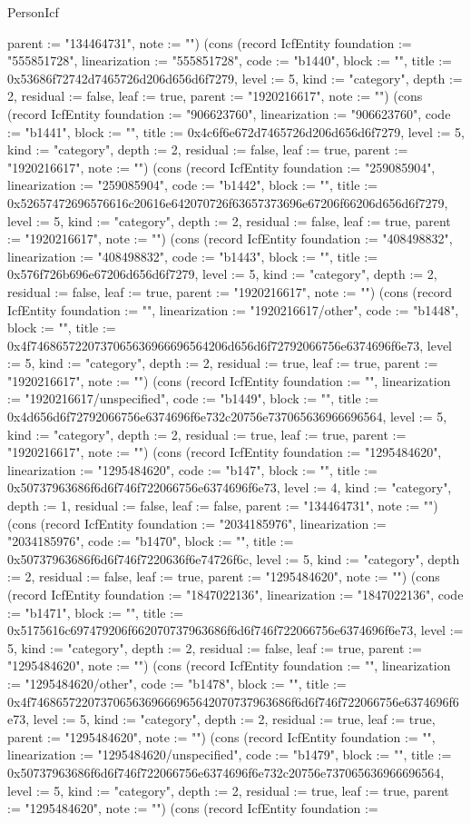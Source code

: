 \begin{lexlean}{PersonIcf}
\begin{semanticmodule}
{parent := "134464731", note := ""}) (cons (record IcfEntity {foundation := "555851728", linearization := "555851728", code := "b1440", block := "", title := 0x53686f72742d7465726d206d656d6f7279, level := 5, kind := "category", depth := 2, residual := false, leaf := true, parent := "1920216617", note := ""}) (cons (record IcfEntity {foundation := "906623760", linearization := "906623760", code := "b1441", block := "", title := 0x4c6f6e672d7465726d206d656d6f7279, level := 5, kind := "category", depth := 2, residual := false, leaf := true, parent := "1920216617", note := ""}) (cons (record IcfEntity {foundation := "259085904", linearization := "259085904", code := "b1442", block := "", title := 0x52657472696576616c20616e642070726f63657373696e67206f66206d656d6f7279, level := 5, kind := "category", depth := 2, residual := false, leaf := true, parent := "1920216617", note := ""}) (cons (record IcfEntity {foundation := "408498832", linearization := "408498832", code := "b1443", block := "", title := 0x576f726b696e67206d656d6f7279, level := 5, kind := "category", depth := 2, residual := false, leaf := true, parent := "1920216617", note := ""}) (cons (record IcfEntity {foundation := "", linearization := "1920216617/other", code := "b1448", block := "", title := 0x4f7468657220737065636966696564206d656d6f72792066756e6374696f6e73, level := 5, kind := "category", depth := 2, residual := true, leaf := true, parent := "1920216617", note := ""}) (cons (record IcfEntity {foundation := "", linearization := "1920216617/unspecified", code := "b1449", block := "", title := 0x4d656d6f72792066756e6374696f6e732c20756e737065636966696564, level := 5, kind := "category", depth := 2, residual := true, leaf := true, parent := "1920216617", note := ""}) (cons (record IcfEntity {foundation := "1295484620", linearization := "1295484620", code := "b147", block := "", title := 0x50737963686f6d6f746f722066756e6374696f6e73, level := 4, kind := "category", depth := 1, residual := false, leaf := false, parent := "134464731", note := ""}) (cons (record IcfEntity {foundation := "2034185976", linearization := "2034185976", code := "b1470", block := "", title := 0x50737963686f6d6f746f7220636f6e74726f6c, level := 5, kind := "category", depth := 2, residual := false, leaf := true, parent := "1295484620", note := ""}) (cons (record IcfEntity {foundation := "1847022136", linearization := "1847022136", code := "b1471", block := "", title := 0x5175616c697479206f662070737963686f6d6f746f722066756e6374696f6e73, level := 5, kind := "category", depth := 2, residual := false, leaf := true, parent := "1295484620", note := ""}) (cons (record IcfEntity {foundation := "", linearization := "1295484620/other", code := "b1478", block := "", title := 0x4f74686572207370656369666965642070737963686f6d6f746f722066756e6374696f6e73, level := 5, kind := "category", depth := 2, residual := true, leaf := true, parent := "1295484620", note := ""}) (cons (record IcfEntity {foundation := "", linearization := "1295484620/unspecified", code := "b1479", block := "", title := 0x50737963686f6d6f746f722066756e6374696f6e732c20756e737065636966696564, level := 5, kind := "category", depth := 2, residual := true, leaf := true, parent := "1295484620", note := ""}) (cons (record IcfEntity {foundation := }
\end{semanticmodule}
\end{lexlean}
